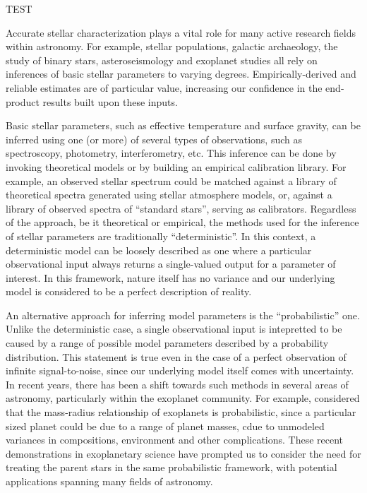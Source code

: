 
TEST

Accurate stellar characterization plays a vital role for many active research 
fields within astronomy. For example, stellar populations, galactic archaeology, 
the study of binary stars, asteroseismology and exoplanet studies all rely on 
inferences of basic stellar parameters to varying degrees. Empirically-derived
and reliable estimates are of particular value, increasing our confidence in the
end-product results built upon these inputs. 

Basic stellar parameters, such as effective temperature and surface gravity, 
can be inferred using one (or more) of several types of observations, such as
spectroscopy, photometry, interferometry, etc. This inference can be done by
invoking theoretical models or by building an empirical calibration library.
For example, an observed stellar spectrum could be matched against a library of 
theoretical spectra generated using stellar atmosphere models, or, against a 
library of observed spectra of ``standard stars'', serving as calibrators.
Regardless of the approach, be it theoretical or empirical, the methods used
for the inference of stellar parameters are traditionally ``deterministic''.
In this context, a deterministic model can be loosely described as one where
a particular observational input always returns a single-valued output for a 
parameter of interest. In this framework, nature itself has no variance and
our underlying model is considered to be a perfect description of reality.

An alternative approach for inferring model parameters is the 
``probabilistic'' one. Unlike the deterministic case, a single observational 
input is intepretted to be caused by a range of possible model parameters
described by a probability distribution. This statement is true even in the case
of a perfect observation of infinite signal-to-noise, since our underlying 
model itself comes with uncertainty. In recent years, there has been a shift 
towards such methods in several areas of astronomy, particularly within the 
exoplanet community. For example, \citet{wolfgang:2015} considered that
the mass-radius relationship of exoplanets is probabilistic, since a particular
sized planet could be due to a range of planet masses, cdue to unmodeled 
variances in compositions, environment and other complications. These recent 
demonstrations in exoplanetary science have prompted us to consider the need for 
treating the parent stars in the same probabilistic framework, with potential 
applications spanning many fields of astronomy.

